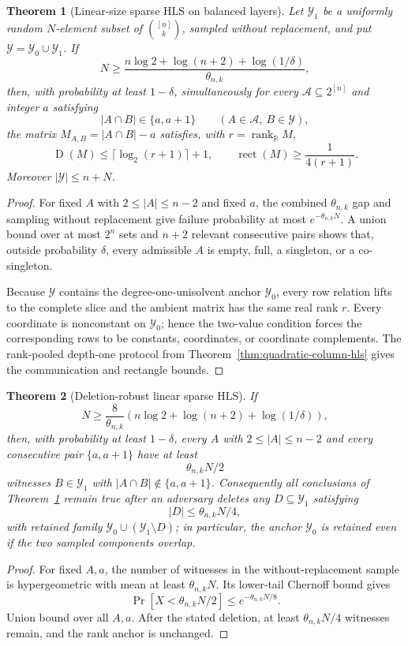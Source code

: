 \documentclass[11pt]{article}
\newtheorem{theorem}{Theorem}[section]
\theoremstyle{definition}
\theoremstyle{remark}
\newcommand{\cA}{\mathcal A}
\newcommand{\cY}{\mathcal Y}
\newcommand{\R}{\mathbb R}
\newcommand{\1}{\mathbf 1}
\newcommand{\rank}{\operatorname{rank}}
\newcommand{\rect}{\operatorname{rect}}
\newcommand{\Dcc}{\operatorname{D}}
\begin{document}
\begin{theorem}[Linear-size sparse HLS on balanced layers]
\label{thm:linear-sparse-hls}
Let $\cY_1$ be a uniformly random $N$-element subset of
$\binom{[n]}k$, sampled without replacement, and put
$\cY=\cY_0\cup\cY_1$.  If
\[
 N\ge
 \frac{n\log2+\log(n+2)+\log(1/\delta)}{\theta_{n,k}},
\]
then, with probability at least $1-\delta$, simultaneously for every
$\cA\subseteq2^{[n]}$ and integer $a$ satisfying
\[
 |A\cap B|\in\{a,a+1\}
 \qquad(A\in\cA,\ B\in\cY),
\]
the matrix $M_{A,B}=|A\cap B|-a$ satisfies, with $r=\rank_{\R}M$,
\[
 \Dcc(M)\le\lceil\log_2(r+1)\rceil+1,
 \qquad
 \rect(M)\ge\frac1{4(r+1)}.
\]
Moreover $|\cY|\le n+N$.
\end{theorem}

\begin{proof}
For fixed $A$ with $2\le|A|\le n-2$ and fixed $a$, the combined
$\theta_{n,k}$ gap and
sampling without replacement give failure probability at most
$e^{-\theta_{n,k}N}$.  A union bound over at most $2^n$ sets and $n+2$
relevant consecutive pairs shows that, outside probability $\delta$, every
admissible $A$ is empty, full, a singleton, or a co-singleton.

Because $\cY$ contains the degree-one-unisolvent anchor $\cY_0$, every row
relation lifts to the complete slice and the ambient matrix has the same real
rank $r$.  Every coordinate is nonconstant on $\cY_0$; hence the two-value
condition forces the corresponding rows to be constants, coordinates, or
coordinate complements.  The rank-pooled depth-one protocol from
Theorem~\ref{thm:quadratic-column-hls} gives the communication and rectangle
bounds.
\end{proof}

\begin{theorem}[Deletion-robust linear sparse HLS]
\label{thm:robust-linear-sparse-hls}
If
\[
 N\ge
 \frac8{\theta_{n,k}}
 \left(n\log2+\log(n+2)+\log(1/\delta)\right),
\]
then, with probability at least $1-\delta$, every $A$ with
$2\le|A|\le n-2$ and every consecutive pair $\{a,a+1\}$ have at least
\[
 \theta_{n,k}N/2
\]
witnesses $B\in\cY_1$ with $|A\cap B|\notin\{a,a+1\}$.  Consequently all
conclusions of Theorem~\ref{thm:linear-sparse-hls} remain true after an
adversary deletes any $D\subseteq\cY_1$ satisfying
\[
 |D|\le\theta_{n,k}N/4,
\]
with retained family $\cY_0\cup(\cY_1\setminus D)$; in particular, the
anchor $\cY_0$ is retained even if the two sampled components overlap.
\end{theorem}

\begin{proof}
For fixed $A,a$, the number of witnesses in the without-replacement sample
is hypergeometric with mean at least $\theta_{n,k}N$.  Its lower-tail
Chernoff bound gives
\[
 \Pr[X<\theta_{n,k}N/2]\le e^{-\theta_{n,k}N/8}.
\]
Union bound over all $A,a$.  After the stated deletion, at least
$\theta_{n,k}N/4$ witnesses remain, and the rank anchor is unchanged.
\end{proof}
\end{document}
